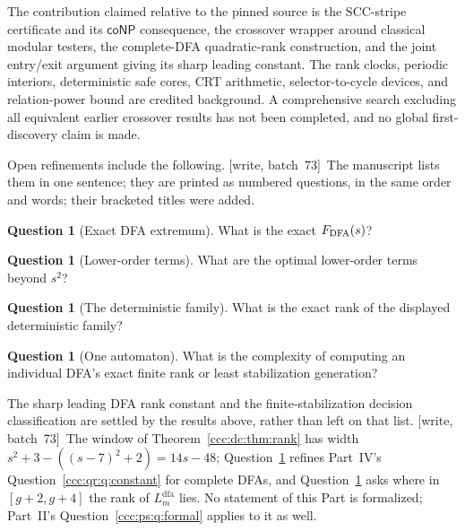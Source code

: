 \documentclass[11pt,letterpaper]{article}
\theoremstyle{definition}
\newtheorem{question}[theorem]{Question}
\theoremstyle{remark}
\newcommand{\wsevthree}{\textup{[write, batch~73]}}
\newcommand{\coNP}{\mathsf{coNP}}
\newcommand{\Ldfa}[1]{L^{\mathrm{dfa}}_{#1}}
\begin{document}
The contribution claimed relative to the pinned source is the SCC-stripe certificate and its $\coNP$ consequence, the crossover wrapper around classical modular testers, the complete-DFA quadratic-rank construction, and the joint entry/exit argument giving its sharp leading constant. The rank clocks, periodic interiors, deterministic safe cores, CRT arithmetic, selector-to-cycle devices, and relation-power bound are credited background. A comprehensive search excluding all equivalent earlier crossover results has not been completed, and no global first-discovery claim is made.

Open refinements include the following.
\wsevthree\ The manuscript lists them in one sentence; they are printed as
numbered questions, in the same order and words; their bracketed titles were
added.

\begin{question}[Exact DFA extremum]\label{ccc:dc:q:exact}
What is the exact $F_{\rm DFA}(s)$?
\end{question}

\begin{question}[Lower-order terms]\label{ccc:dc:q:lower-order}
What are the optimal lower-order terms beyond $s^2$?
\end{question}

\begin{question}[The deterministic family]\label{ccc:dc:q:family}
What is the exact rank of the displayed deterministic family?
\end{question}

\begin{question}[One automaton]\label{ccc:dc:q:individual}
What is the complexity of computing an individual DFA's exact finite rank or
least stabilization generation?
\end{question}

The sharp leading DFA rank constant and the finite-stabilization decision classification are settled by the results above, rather than left on that list.
\wsevthree\ The window of Theorem~\ref{ccc:dc:thm:rank} has width
$s^2+3-((s-7)^2+2)=14s-48$; Question~\ref{ccc:dc:q:exact} refines Part~IV's
Question~\ref{ccc:qr:q:constant} for complete DFAs, and
Question~\ref{ccc:dc:q:family} asks where in $[g+2,g+4]$ the rank of
$\Ldfa m$ lies. No statement of this Part is formalized; Part~II's
Question~\ref{ccc:ps:q:formal} applies to it as well.
\end{document}
